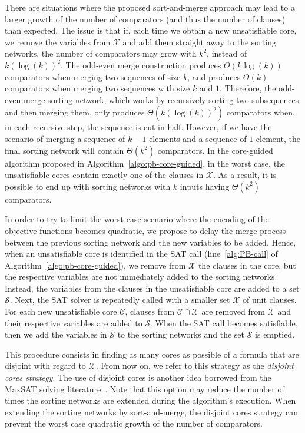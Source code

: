 \documentclass[a4paper,UKenglish,cleveref, autoref, thm-restate]{lipics-v2021}
\begin{document}
There are situations where the proposed sort-and-merge approach may lead to a larger growth of the number of comparators (and thus the number of clauses) than expected. 
The issue is that if, each time we obtain a new unsatisfiable core, we remove the variables from $\mathcal{X}$ and add them straight away to the sorting networks, the number of comparators may grow with $k^2$, instead of $k(\log(k))^2$.
The odd-even merge construction produces $\Theta(k\log(k))$ comparators when merging two sequences of size $k$, and produces $\Theta(k)$ comparators when merging two sequences with size $k$ and $1$.
Therefore, the odd-even merge sorting network, which works by recursively sorting two subsequences and then merging them, only produces $\Theta(k(\log(k))^2)$ comparators when, in each recursive step, the sequence is cut in half.
However, if we have the scenario of merging a sequence of $k-1$ elements and a sequence of $1$ element, the final sorting network will contain $\Theta(k^2)$ comparators.
In the core-guided algorithm proposed in Algorithm~\ref{algo:pb-core-guided}, in the worst case, the unsatisfiable cores contain exactly one of the clauses in $\mathcal{X}$. As a result, it is possible to end up with sorting networks with $k$ inputs having $\Theta(k^2)$ comparators.

In order to try to limit the worst-case scenario where the encoding of the objective functions becomes quadratic, we propose to delay the merge process between the previous sorting network and the new variables to be added.
Hence, when an unsatisfiable core is identified in the SAT call (line~\ref{alg:PB-call} of Algorithm~\ref{algo:pb-core-guided}), we remove from $\mathcal{X}$ the clauses in the core, but the respective variables are not immediately added to the sorting networks.
Instead, the variables from the clauses in the unsatisfiable core are added to a set $\mathcal{S}$. 
Next, the SAT solver is repeatedly called with a smaller set $\mathcal{X}$ of unit clauses. For each new unsatisfiable core $\mathcal{C}$, clauses from $\mathcal{C} \cap \mathcal{X}$ are removed from $\mathcal{X}$ and their respective variables are added to $\mathcal{S}$.
When the SAT call becomes satisfiable, then we add the variables in $\mathcal{S}$ to the sorting networks and the set $\mathcal{S}$ is emptied.

This procedure consists in finding as many cores as possible of a formula that are disjoint with regard to $\mathcal{X}$. From now on, we refer to this strategy as the \emph{disjoint cores strategy}.
The use of disjoint cores is another idea borrowed from the MaxSAT solving literature~\cite{DBLP:conf/cp/DaviesB11,DBLP:conf/cp/BergJ17}.
Note that this option may reduce the number of times the sorting networks are extended during the algorithm's execution.
When extending the sorting networks by sort-and-merge, the disjoint cores strategy can prevent the worst case quadratic growth of the number of comparators. 
\end{document}
